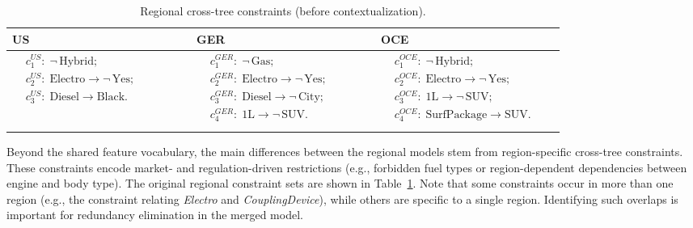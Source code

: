 \documentclass{ceurart}
\begin{document}
\begin{table}[h]
\caption{Regional cross-tree constraints (before contextualization).}
\label{tab:constraints-regional}
\centering
\begin{tabular}{p{0.30\linewidth} p{0.30\linewidth} p{0.30\linewidth}}
\toprule
\textbf{US} &
\textbf{GER} &
\textbf{OCE} \\
\midrule
$\begin{aligned}
&c^{US}_1:\; \neg\,\text{Hybrid};\\[0.2em]
&c^{US}_2:\; \text{Electro} \rightarrow \neg\,\text{Yes};\\[0.2em]
&c^{US}_3:\; \text{Diesel} \rightarrow \text{Black}.\\
\end{aligned}$
&
$\begin{aligned}
&c^{GER}_1:\; \neg\,\text{Gas};\\[0.2em]
&c^{GER}_2:\; \text{Electro} \rightarrow \neg\,\text{Yes};\\[0.2em]
&c^{GER}_3:\; \text{Diesel} \rightarrow \neg\,\text{City};\\[0.2em]
&c^{GER}_4:\; \text{1L} \rightarrow \neg\,\text{SUV}.\\
\end{aligned}$
&
$\begin{aligned}
&c^{OCE}_1:\; \neg\,\text{Hybrid};\\[0.2em]
&c^{OCE}_2:\; \text{Electro} \rightarrow \neg\,\text{Yes};\\[0.2em]
&c^{OCE}_3:\; \text{1L} \rightarrow \neg\,\text{SUV};\\[0.2em]
&c^{OCE}_4:\; \text{SurfPackage} \rightarrow \text{SUV}.\\
\end{aligned}$
\\
\bottomrule
\end{tabular}
\end{table}

Beyond the shared feature vocabulary, the main differences between
the regional models stem from region-specific cross-tree constraints.
These constraints encode market- and regulation-driven restrictions
(e.g., forbidden fuel types or region-dependent dependencies between
engine and body type).  The original regional constraint sets are
shown in Table~\ref{tab:constraints-regional}.  Note that some
constraints occur in more than one region (e.g., the constraint
relating \textit{Electro} and \textit{CouplingDevice}), while others
are specific to a single region.  Identifying such overlaps is
important for redundancy elimination in the merged model.
\end{document}
